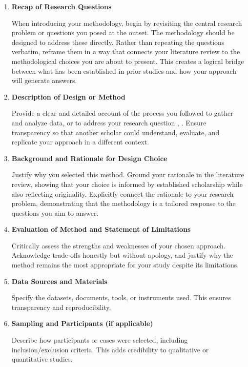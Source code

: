 \begin{enumerate}
  \item \textbf{Recap of Research Questions}\par
  When introducing your methodology, begin by revisiting the central research problem or questions you posed at the outset. The methodology should be designed to address these directly. Rather than repeating the questions verbatim, reframe them in a way that connects your literature review to the methodological choices you are about to present. This creates a logical bridge between what has been established in prior studies and how your approach will generate answers.

  \item \textbf{Description of Design or Method}\par
  Provide a clear and detailed account of the process you followed to gather and analyze data, or to address your research question \cite{creswell2018}, \cite{yin2018}. Ensure transparency so that another scholar could understand, evaluate, and replicate your approach in a different context.

  \item \textbf{Background and Rationale for Design Choice}\par
  Justify why you selected this method. Ground your rationale in the literature review, showing that your choice is informed by established scholarship while also reflecting originality. Explicitly connect the rationale to your research problem, demonstrating that the methodology is a tailored response to the questions you aim to answer.

  \item \textbf{Evaluation of Method and Statement of Limitations}\par
  Critically assess the strengths and weaknesses of your chosen approach. Acknowledge trade-offs honestly but without apology, and justify why the method remains the most appropriate for your study despite its limitations.

  \item \textbf{Data Sources and Materials}\par
  Specify the datasets, documents, tools, or instruments used. This ensures transparency and reproducibility.

  \item \textbf{Sampling and Participants (if applicable)}\par
  Describe how participants or cases were selected, including inclusion/exclusion criteria. This adds credibility to qualitative or quantitative studies.


\end{enumerate}
